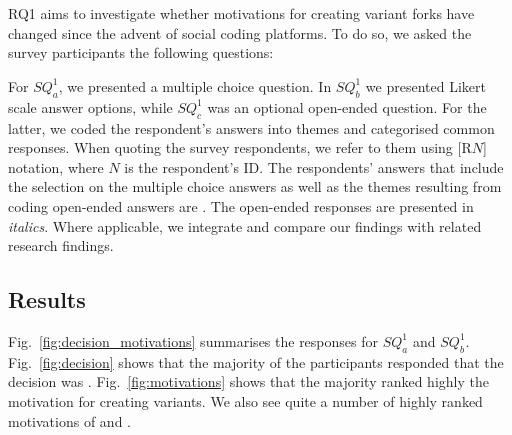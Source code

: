 \section{\RQOne}
\label{sec:results-RQ1}
RQ1 aims to investigate whether motivations for creating variant forks have changed since the advent of social coding platforms. To do so, we asked the survey participants the following questions:

 \rqOneOne

 \rqOneTwo

\rqOneThree



For $SQ^1_{a}$, we presented a multiple choice question. In $SQ^1_{b}$ we presented Likert scale answer options, while $SQ^1_{c}$ was an optional open-ended question. For the latter, we coded the respondent's answers into themes and categorised common responses.
When quoting the survey respondents, we refer to them using [R$N$] notation, where $N$ is the respondent's ID.
The respondents' answers that include the selection on the multiple choice answers as well as the themes resulting from coding open-ended answers are .
The open-ended responses are presented in \emph{italics}.
Where applicable, we integrate and compare our findings with related research findings.

\subsection{Results}
Fig.~\ref{fig:decision_motivations} summarises the responses for $SQ^1_{a}$ and $SQ^1_{b}$. Fig.~\ref{fig:decision} shows that the majority of the participants responded that the decision was . Fig.~\ref{fig:motivations} shows that the majority ranked highly the  motivation for creating variants. We also see quite a number of highly ranked motivations of  and .

